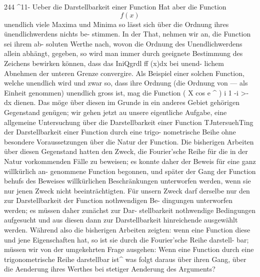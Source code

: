 \documentclass[12pt,a4paper]{book}
\theoremstyle{definition}
\theoremstyle{remark}
\begin{document}
{{{{%
244  ^11-    Ueber  die  Darstellbarkeit  einer  Function
Hat  aber  die  Function  $$f(x)$$  unendlich  viele  Maxima  und  Minima
so  lässt  sich  über  die  Ordnung  ihres  ünendlichwerdens  nichts  be-
stimmen. In  der  That,  nehmen  wir  an,  die  Function  sei  ihrem  ab-
soluten Werthe  nach,  wovon  die  Ordnung  des  Unendlichwerdens  allein
abhängt,  gegeben,  so  wird  man  immer  durch  geeignete  Bestimmung
des  Zeichens  bewirken  können,  dass  das  IniQgrdl  ff (x)dx  bei  unend-
lichem Abnehmen  der  unteren  Grenze  convergire.  Als  Beispiel  einer
solchen  Function,  welche  unendlich  wird  und  zwar  so,  dass  ihre  Ordnung
(die  Ordnung  von  ---  als  Einheit  genommen)  unendlich  gross  ist,  mag
die  Function
(  X  cos  e  ^  )
i         1     -i  >-
dx
dienen.
Das  möge  über  diesen  im  Grunde  in  ein  anderes  Gebiet  gehörigen
Gegenstand  genügen;  wir  gehen  jetzt  au  unsere  eigentliche  Aufgabe,
eine  allgemeine  Untersuchung  über  die  Darstellbarkeit  einer  Function
TJntersuehTing  der  Darstellbarkeit  einer  Function  durch  eine  trigo-
nometrische Beihe  ohne  besondere  Voraussetzungen  über  die  Natur
der  Function.
Die  bisherigen  Arbeiten  über  diesen  Gegenstand  hatten  den  Zweck,
die  Fourier'sche  Reihe  für  die  in  der  Natur  vorkommenden  Fälle  zu
beweisen;  es  konnte  daher  der  Beweis  für  eine  ganz  willkürlich  an-
genommene Function  begonnen,  und  später  der  Gang  der  Function  behufs
des  Beweises  willkürlichen  Beschränkungen  unterworfen  werden,  wenn
sie  nur  jenen  Zweck  nicht  beeinträchtigten.  Für  unsern  Zweck  darf
derselbe  nur  den  zur  Darstellbarkeit  der  Function  nothwendigen  Be-
dingungen unterworfen  werden;  es  müssen  daher  zunächst  zur  Dar-
stellbarkeit nothwendige  Bedingungen  aufgesucht  und  aus  diesen  dann
zur  Darstellbarkeit  hinreichende  ausgewählt  werden.  Während  also
die  bisherigen  Arbeiten  zeigten:  wenn  eine  Function  diese  und  jene
Eigenschaften  hat,  so  ist  sie  durch  die  Fourier'sche  Reihe  darstell-
bar; müssen  wir  von  der  umgekehrten  Frage  ausgehen:  Wenn  eine
Function  durch  eine  trigonometrische  Reihe  darstellbar  ist^  was  folgt
daraus  über  ihren  Gang,  über  die  Aenderung  ihres  Werthes  bei  stetiger
Aenderung  des  Arguments?
\newpage

}}}}
\end{document}
